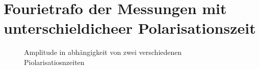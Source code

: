 \section{Fourietrafo der Messungen mit unterschieldicheer Polarisationszeit}
\begin{figure}[H]
    \centering
    
    \caption{Amplitude in abhängigkeit von zwei verschiedenen Piolarisatiosnzeiten}
\end{figure}